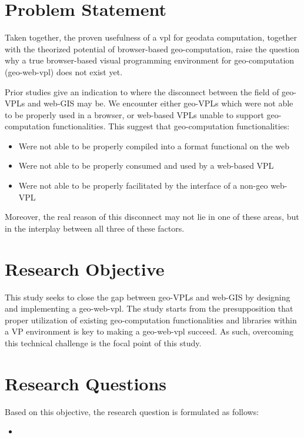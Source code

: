 


\section{Problem Statement}
Taken together, the proven usefulness of a vpl for geodata computation, together with the theorized potential of browser-based geo-computation, raise the question why a true browser-based visual programming environment for geo-computation (geo-web-vpl) does not exist yet.

Prior studies give an indication to where the disconnect between the field of geo-VPLs and web-GIS may be.  
We encounter either geo-VPLs which were not able to be properly used in a browser, or web-based VPLs unable to support geo-computation functionalities.
This suggest that geo-computation functionalities:
\begin{itemize}[-]
  \item Were not able to be properly compiled into a format functional on the web
  \item Were not able to be properly consumed and used by a web-based VPL
  \item Were not able to be properly facilitated by the interface of a non-geo web-VPL
\end{itemize}

Moreover, the real reason of this disconnect may not lie in one of these areas, but in the interplay between all three of these factors. 

\newpage
\section{Research Objective}
This study seeks to close the gap between geo-VPLs and web-GIS by designing and implementing a geo-web-vpl.
The study starts from the presupposition that proper utilization of existing geo-computation functionalities and libraries within a VP environment is key to making a geo-web-vpl succeed. 
As such, overcoming this technical challenge is the focal point of this study. 

\section{Research Questions}
Based on this objective, the research question is formulated as follows: 
\begin{itemize}[ ]
  \item \myMainRQ
\end{itemize}

